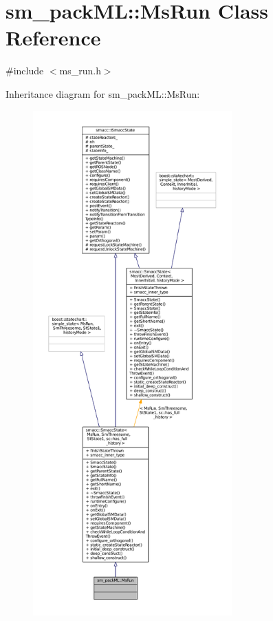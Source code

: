 \hypertarget{classsm__packML_1_1MsRun}{}\section{sm\+\_\+pack\+ML\+:\+:Ms\+Run Class Reference}
\label{classsm__packML_1_1MsRun}


{\ttfamily \#include $<$ms\+\_\+run.\+h$>$}



Inheritance diagram for sm\+\_\+pack\+ML\+:\+:Ms\+Run\+:
\nopagebreak
\begin{figure}[H]
\begin{center}
\leavevmode
\includegraphics[height=550pt]{classsm__packML_1_1MsRun__inherit__graph}
\end{center}
\end{figure}


